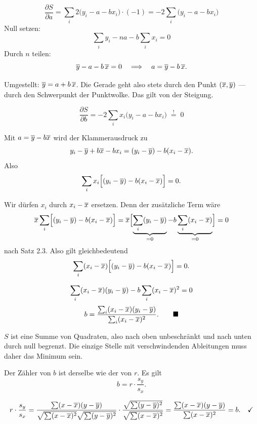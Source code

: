 \begin{merksatz}
\[ \frac{\partial S}{\partial a} = \sum_i 2\bigl(y_i - a - bx_i\bigr)\cdot(-1) = -2\sum_i \bigl(y_i - a - bx_i\bigr) \]
Null setzen:
\[ \sum_i y_i - na - b\sum_i x_i = 0 \]
Durch $n$ teilen:
\[ \overline y - a - b\,\overline{x} = 0 \quad\Longrightarrow\quad a = \overline y - b\,\overline{x} . \]

Umgestellt: $\overline y = a + b\,\overline{x}$. Die Gerade geht also stets durch den Punkt $(\overline{x}, \overline y)$ --- durch den Schwerpunkt der Punktwolke. Das gilt  von der Steigung.

\[ \frac{\partial S}{\partial b} = -2\sum_i x_i\bigl(y_i - a - bx_i\bigr) \;\stackrel{!}{=}\; 0 \]

Mit $a = \overline y - b\overline{x}$ wird der Klammerausdruck zu
\[ y_i - \overline y + b\overline{x} - bx_i = (y_i - \overline y) - b(x_i - \overline{x}) . \]
Also
\[ \sum_i x_i\Bigl[(y_i-\overline y) - b(x_i-\overline{x})\Bigr] = 0 . \]

Wir dürfen $x_i$ durch $x_i - \overline{x}$ ersetzen. Denn der zusätzliche Term wäre
\[ \overline{x}\sum_i\Bigl[(y_i-\overline y) - b(x_i-\overline{x})\Bigr] = \overline{x}\Bigl[\underbrace{\sum_i(y_i-\overline y)}_{=0} - b\underbrace{\sum_i(x_i-\overline{x})}_{=0}\Bigr] = 0 \]
nach Satz 2.3. Also gilt gleichbedeutend
\[ \sum_i (x_i-\overline{x})\Bigl[(y_i-\overline y) - b(x_i-\overline{x})\Bigr] = 0 . \]

\[ \sum_i (x_i-\overline{x})(y_i-\overline y) - b\sum_i (x_i-\overline{x})^2 = 0 \]
\[ b = \frac{\sum_i (x_i-\overline{x})(y_i-\overline y)}{\sum_i (x_i-\overline{x})^2} . \qquad \blacksquare \]

$S$ ist eine Summe von Quadraten, also nach oben unbeschränkt und nach unten durch null begrenzt. Die einzige Stelle mit verschwindenden Ableitungen muss daher das Minimum sein.
\end{merksatz}

\begin{merksatz}
Der Zähler von $b$ ist derselbe wie der von $r$. Es gilt
\[ b = r \cdot \frac{s_y}{s_x} . \]

\[ r\cdot\frac{s_y}{s_x} = \frac{\sum(x-\overline{x})(y-\overline y)}{\sqrt{\sum(x-\overline{x})^2}\sqrt{\sum(y-\overline y)^2}} \cdot \frac{\sqrt{\sum(y-\overline y)^2}}{\sqrt{\sum(x-\overline{x})^2}} = \frac{\sum(x-\overline{x})(y-\overline y)}{\sum(x-\overline{x})^2} = b . \quad \checkmark \]

\begin{center}
\begin{minipage}{0.88\textwidth}
\end{minipage}
\end{center}
\end{merksatz}

